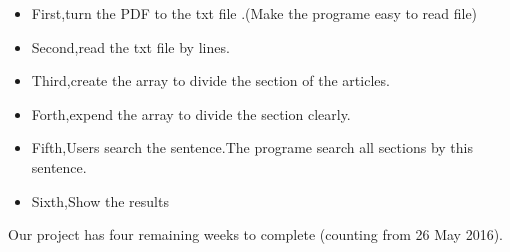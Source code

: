 \begin{itemize}
	
	\item First,turn the PDF to the txt file .(Make the programe easy to read file)
	\item Second,read the txt file by lines.
	\item Third,create the array to divide the section of the articles.
	\item Forth,expend the array to divide the section clearly.
	\item Fifth,Users search the sentence.The programe search all sections by this sentence.
	\item Sixth,Show the results
	
\end{itemize}

Our project has four remaining weeks to complete (counting from 26 May 2016).

\newpage %